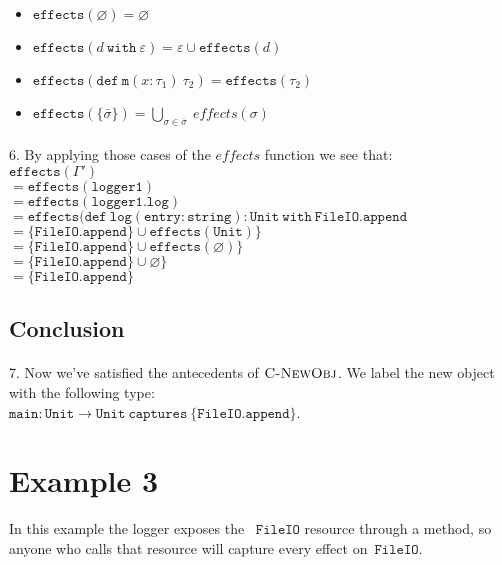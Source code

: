 \documentclass{llncs}
\newcommand{\keywadj}[1]{\mathtt{#1}}
\newcommand{\keyw}[1]{\keywadj{#1}~}
\begin{document}
\begin{itemize}
	\item $\keywadj{effects}(\varnothing) = \varnothing$
	\item $\keywadj{effects}(d~\keyw{with} \varepsilon) = \varepsilon \cup \keywadj{effects}(d)$
	\item $\keywadj{effects}(\keywadj{def~m}(x : \tau_1)~\tau_2) = \keywadj{effects}(\tau_2)$
	\item $\keywadj{effects}(\{\bar \sigma\}) = \bigcup_{\sigma \in \bar \sigma}~effects(\sigma)$
\end{itemize}

\paragraph{}
6. By applying those cases of the $effects$ function we see that:\\
$\keywadj{effects(\Gamma')}$\\
$\keywadj{= effects(logger1)}$\\
$\keywadj{= effects(logger1.log)}$\\
$ = \keywadj{effects(def~log(entry : string) : Unit~with~FileIO.append}$\\
$ = \keywadj{\{FileIO.append\} \cup effects(Unit)\}}$\\
$ = \keywadj{\{FileIO.append\} \cup effects(\varnothing)\}}$\\
$ = \keywadj{\{FileIO.append\} \cup \varnothing\}}$\\
$ = \keywadj{\{FileIO.append\}}$

\subsection*{Conclusion}

\paragraph{}
7. Now we've satisfied the antecedents of $\textsc{C-NewObj}$. We label the new object with the following type:\\
$\keywadj{ main : Unit \rightarrow Unit~captures~\{ FileIO.append \} }$.

\section{Example 3}

In this example the logger exposes the ~$\keywadj{FileIO}$ resource through a method, so anyone who calls that resource will capture every effect on~$\keywadj{FileIO}$.\\
\end{document}
